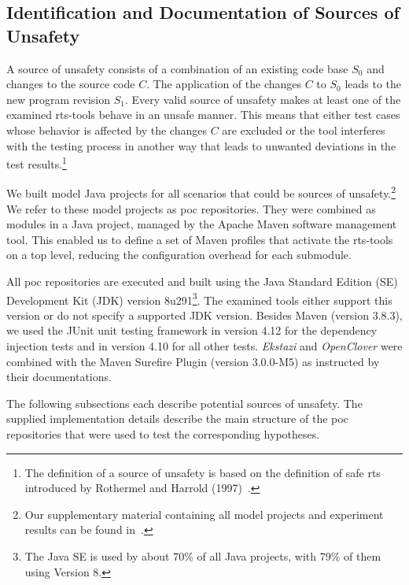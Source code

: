 \subsection{Identification and Documentation of Sources of Unsafety}\label{ssec:pocs}

\begin{definition}\label{def:unsafety}
    A source of unsafety consists of a combination of an existing code base $S_0$ and changes
    to the source code $C$. The application of the changes $C$ to $S_0$ leads to the new program revision
    $S_1$. Every valid source of unsafety makes at least one of the examined
    \ac{rts}-tools behave in an unsafe manner. This means that either test cases whose behavior is
    affected by the changes $C$ are excluded or the tool interferes with the testing process in another
    way that leads to unwanted deviations in the test results.\footnote{The definition of a source of
        unsafety is based on the definition of safe \ac{rts} introduced by Rothermel and Harrold (1997)~\cite{safe_definition}.}
\end{definition}

We built model Java projects for all scenarios that could be sources of unsafety.\footnote{Our
    supplementary material containing all model projects and experiment results can be found in~\cite{poc_github}.} We refer to
these model projects as \ac{poc} repositories. They were combined as modules in a Java project,
managed by the Apache Maven software management tool. This enabled us to define a set of Maven
profiles that activate the \ac{rts}-tools on a top level, reducing the configuration overhead for each
submodule.

All \ac{poc} repositories are executed and built using the Java Standard Edition (SE) Development
Kit (JDK) version 8u291\footnote{The Java SE is used by about 70\% of all Java projects, with 79\%
    of them using Version 8.}. The examined tools either support this version or do not specify a
supported JDK version. Besides Maven (version 3.8.3), we used the JUnit unit testing framework in
version 4.12 for the dependency injection tests and in version 4.10 for all other tests. \emph{Ekstazi} and
\emph{OpenClover} were combined with the Maven Surefire Plugin (version 3.0.0-M5) as
instructed by their documentations.

The following subsections each describe potential sources of unsafety. The supplied implementation
details describe the main structure of the \ac{poc} repositories that were used to test
the corresponding hypotheses.

